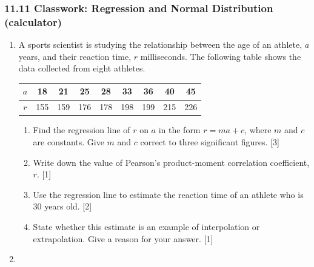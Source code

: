 \documentclass[12pt, twoside]{article}
\begin{document}
\subsubsection*{11.11 Classwork: Regression and Normal Distribution (calculator)}

\begin{enumerate}[itemsep=0.15cm]

\item[1.] [Maximum mark: 7]

A sports scientist is studying the relationship between the age of an athlete, $a$ years,
and their reaction time, $r$ milliseconds. The following table shows the data collected
from eight athletes.

\renewcommand{\arraystretch}{1.2}
\begin{center}
\begin{tabular}{|c|c|c|c|c|c|c|c|c|}
\hline
$a$ & 18 & 21 & 25 & 28 & 33 & 36 & 40 & 45 \\
\hline
$r$ & 155 & 159 & 176 & 178 & 198 & 199 & 215 & 226 \\
\hline
\end{tabular}
\end{center}
\renewcommand{\arraystretch}{1.0}

\begin{enumerate}[itemsep=0.1cm]
  \item[(a)] Find the regression line of $r$ on $a$ in the form $r = ma + c$,
  where $m$ and $c$ are constants.
  Give $m$ and $c$ correct to three significant figures. \hfill [3]
  \item[(b)] Write down the value of Pearson's product-moment correlation
  coefficient, $r$. \hfill [1]
  \item[(c)] Use the regression line to estimate the reaction time
  of an athlete who is 30 years old. \hfill [2]
  \item[(d)] State whether this estimate is an example of interpolation or
  extrapolation. Give a reason for your answer. \hfill [1]
\end{enumerate}


\newpage

\item[2.] [Maximum mark: 8]


\end{enumerate}
\end{document}
